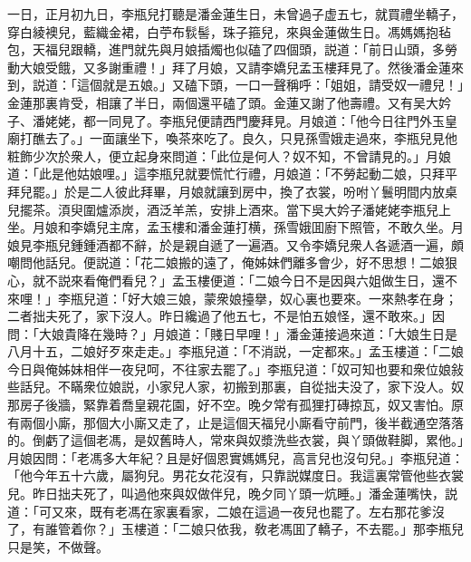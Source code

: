 一日，正月初九日，李瓶兒打聽是潘金蓮生日，未曾過子虚五七，就買禮坐轎子，穿白綾襖兒，藍織金裙，白苧布䯼髻，珠子箍兒，來與金蓮做生日。馮媽媽抱毡包，天福兒跟轎，進門就先與月娘插燭也似磕了四個頭，説道：「前日山頭，多勞動大娘受餓，又多謝重禮！」拜了月娘，又請李嬌兒孟玉樓拜見了。然後潘金蓮來到，説道：「這個就是五娘。」又磕下頭，一口一聲稱呼：「姐姐，請受奴一禮兒！」金蓮那裏肯受，相讓了半日，兩個還平磕了頭。金蓮又謝了他壽禮。又有吴大妗子、潘姥姥，都一同見了。李瓶兒便請西門慶拜見。月娘道：「他今日往門外玉皇廟打醮去了。」一面讓坐下，喚茶來吃了。良久，只見孫雪娥走過來，李瓶兒見他粧飾少次於衆人，便立起身來問道：「此位是何人？奴不知，不曾請見的。」月娘道：「此是他姑娘哩。」這李瓶兒就要慌忙行禮，月娘道：「不勞起動二娘，只拜平拜兒罷。」於是二人彼此拜畢，月娘就讓到房中，換了衣裳，吩咐丫鬟明間内放桌兒擺茶。湏臾圍爐添炭，酒泛羊羔，安排上酒來。當下吳大妗子潘姥姥李瓶兒上坐。月娘和李嬌兒主席，孟玉樓和潘金蓮打横，孫雪娥囬廚下照管，不敢久坐。月娘見李瓶兒鍾鍾酒都不辭，於是親自遞了一遍酒。又令李嬌兒衆人各遞酒一遍，頗嘲問他話兒。便説道：「花二娘搬的遠了，俺姊妹們離多會少，好不思想！二娘狠心，就不説來看俺們看兒？」孟玉樓便道：「二娘今日不是因與六姐做生日，還不來哩！」李瓶兒道：「好大娘三娘，蒙衆娘擡擧，奴心裏也要來。一來熱孝在身；二者拙夫死了，家下沒人。昨日纔過了他五七，不是怕五娘怪，還不敢來。」因問：「大娘貴降在幾時？」月娘道：「賤日早哩！」潘金蓮接過來道：「大娘生日是八月十五，二娘好歹來走走。」李瓶兒道：「不消説，一定都來。」孟玉樓道：「二娘今日與俺姊妹相伴一夜兒呵，不往家去罷了。」李瓶兒道：「奴可知也要和衆位娘敍些話兒。不瞞衆位娘説，小家兒人家，初搬到那裏，自從拙夫没了，家下没人。奴那房子後牆，緊靠着喬皇親花園，好不空。晚夕常有孤狸打磚掠瓦，奴又害怕。原有兩個小廝，那個大小廝又走了，止是這個天福兒小廝看守前門，後半截通空落落的。倒虧了這個老馮，是奴舊時人，常來與奴漿洗些衣裳，與丫頭做鞋脚，累他。」月娘因問：「老馮多大年紀？且是好個恩實媽媽兒，高言兒也沒句兒。」李瓶兒道：「他今年五十六歲，屬狗兒。男花女花沒有，只靠説媒度日。我這裏常管他些衣裳兒。昨日拙夫死了，叫過他來與奴做伴兒，晚夕同丫頭一炕睡。」潘金蓮嘴快，説道：「可又來，既有老馮在家裏看家，二娘在這過一夜兒也罷了。左右那花爹沒了，有誰管着你？」玉樓道：「二娘只依我，敎老馮囬了轎子，不去罷。」那李瓶兒只是笑，不做聲。

